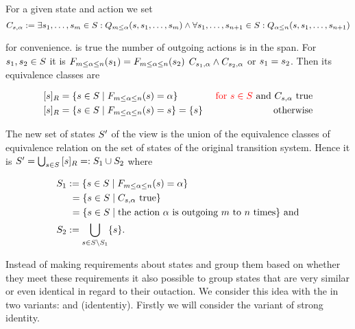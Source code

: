 \documentclass[preview]{standalone}
\begin{document}
For a given state \state and action \action we set
\[
\formoutact:= \exists \state_1, \dots, \state_\numoutactb \in \states: \predminoutact[\numoutactb]\land \\
\forall \state_1, \dots, \state_{\numoutact+1} \in \states: \predmaxoutact
\]

for convenience. \formoutact is true  \iffN the number of outgoing actions is in the span. For $\state_1, \state_2 \in \states$ it is $\gfctspanoutaction(\state_1) = \gfctspanoutaction(\state_2)$ \iffN $\formoutact[\state_1] \land \formoutact[\state_2]$ or $\state_1 = \state_2$. Then its equivalence classes are

\begin{align*}
	\eqclassv{\state} &= \{\state \in \states \mid \gfctspanoutaction(\state) = \action\} &\redcomment{\text{ for } \state \in \states} \text{ and } \formoutact \text{ true} \\
	\eqclassv{\state} &= \{\state \in \states \mid \gfctspanoutaction(\state) = \state\} = \{\state\} &\text{ otherwise}	
\end{align*}

The new set of states $\states'$ of the view \viewspanoutaction is the union of the equivalence classes of equivalence relation \eqrelview on the set of states \states of the original transition system. Hence it is $\states' = \bigcup_{\state \in \states} \eqclassv{\state} =: \states_1 \cup \states_2$ where

\begin{align*}
	\states_1 &:= \{\state \in \states \mid \gfctspanoutaction(\state) = \action\} \\
	&\hspace{1.15mm}= \{\state \in \states  \mid \formoutact \text{ true}\} \\
	&\hspace{1.15mm}= \{\state \in \states \mid \text{the action } \action \text{ is outgoing } \numoutactb \text{ to } \numoutact \text{ times}\} \text{ and} \\
	\states_2 &:= \bigcup_{\state \in \states \setminus \states_1}\{\state\}.
\end{align*}


Instead of making requirements about states and group them based on whether they meet these requirements it also possible to group states that are very similar or even identical in regard to their outaction. We consider this idea with the \emph{\outactident \viewNC} in two variants: \outactidentstrong and \outactidentweak (idententiy). Firstly we will consider the variant of strong identity.
\end{document}
